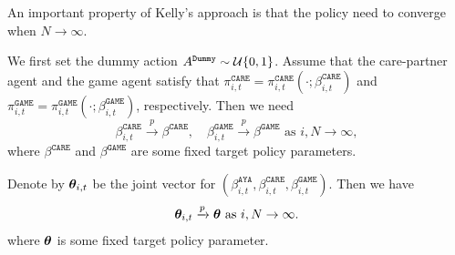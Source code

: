 \documentclass{article}
\def\AYA{{\texttt{AYA}}}
\def\EDGE{{\texttt{GAME}}}
\def\CARE{{\texttt{CARE}}}
\def\Dummy{{\texttt{Dummy}}}
\begin{document}
An important property of Kelly's approach is that the policy need to converge when $N \rightarrow \infty$.

We first set the dummy action $A^{\Dummy} \sim \gU\{0, 1\}$. Assume that the care-partner agent and the game agent satisfy that $\pi_{i, t}^{\CARE} = \pi_{i, t}^{\CARE}(\cdot; \beta_{i, t}^{\CARE})$ and $\pi_{i, t}^{\EDGE} = \pi_{i, t}^{\EDGE}(\cdot; \beta_{i, t}^{\EDGE})$, respectively. Then we need
$$
    \beta_{i, t}^{\CARE} \xrightarrow{p} \beta^{\CARE}, \quad \beta_{i, t}^{\EDGE} \xrightarrow{p} \beta^{\EDGE} \text{ as } i,N \rightarrow \infty,
$$
where $\beta^{\CARE}$ and $\beta^{\EDGE}$ are some fixed target policy parameters.

Denote by ${\bm{\theta}}_{i, t}$ be the joint vector for $(\beta_{i, t}^{\AYA}, \beta_{i, t}^{\CARE}, \beta_{i, t}^{\EDGE})$. Then we have
$$
    {\bm{\theta}}_{i, t} \xrightarrow{p} {\bm{\theta}} \text{ as } i,N \rightarrow \infty.
$$
where ${\bm{\theta}}$ is some fixed target policy parameter.




\end{document}
